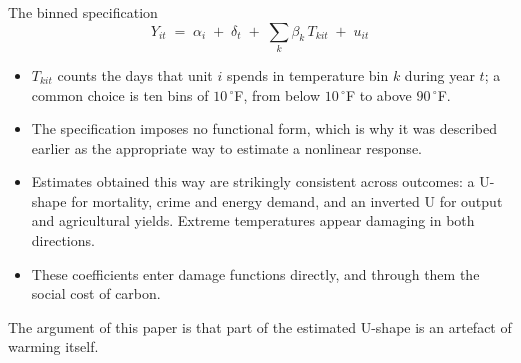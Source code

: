 \documentclass[aspectratio=169,10pt]{beamer}
\begin{document}
\begin{frame}{The binned specification}
  \[
    Y_{it} \;=\; \alpha_i \;+\; \delta_t
    \;+\; \sum_k \beta_k\, T_{kit} \;+\; u_{it}
  \]
  \begin{itemize}
    \item $T_{kit}$ counts the days that unit $i$ spends in temperature bin $k$ during
          year $t$; a common choice is ten bins of $10\,^\circ$F, from below
          $10\,^\circ$F to above $90\,^\circ$F.
    \item The specification imposes no functional form, which is why it was described
          earlier as the appropriate way to estimate a nonlinear response.
    \item Estimates obtained this way are strikingly consistent across outcomes: a
          U-shape for mortality, crime and energy demand, and an inverted U for output
          and agricultural yields. Extreme temperatures appear damaging in both
          directions.
    \item These coefficients enter damage functions directly, and through them the
          social cost of carbon.
  \end{itemize}
  \vspace{2pt}
  \centering\color{climred}The argument of this paper is that part of the estimated
  U-shape is an artefact of warming itself.
\end{frame}
\end{document}
